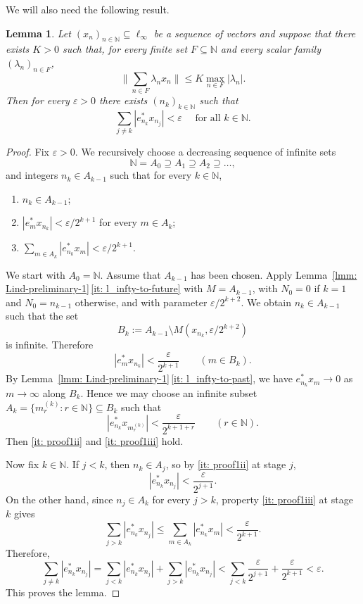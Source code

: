 \documentclass[11pt]{amsart}
\theoremstyle{plain}
\newtheorem{lemma}[theorem]{Lemma}
\theoremstyle{definition}
\numberwithin{equation}{section}
\newcommand{\norm}[1]{\lVert #1 \rVert}
\newcommand{\N}{\mathbb{N}}
\renewcommand{\le}{\leqslant}
\renewcommand{\leq}{\leqslant}
\begin{document}
We will also need the following result.

\begin{lemma}\label{lmm: l_inf-separate-interference}
    Let $(x_n)_{n \in \N} \subseteq \ell_\infty$ be a sequence of vectors and suppose that there exists $K > 0$ such that, for every finite set $F\subseteq\N$ and every scalar family $(\lambda_n)_{n\in F}$,
    \begin{equation}\label{eq: l_infty_summable}
        \norm{\sum_{n\in F} \lambda_n x_n} \leq K \max_{n\in F} |\lambda_n|.
    \end{equation}
     Then for every $\varepsilon > 0$ there exists $(n_k)_{k \in \N}$ such that
     \begin{equation*}
         \sum_{j \not=k} |e_{n_k}^* x_{n_j}| < \varepsilon \quad \text{ for all } k \in \N.
     \end{equation*}
\end{lemma}
\begin{proof}
Fix $\varepsilon>0$. We recursively choose a decreasing sequence of infinite sets
\[
\N = A_0\supseteq A_1\supseteq A_2\supseteq \ldots,
\]
and integers $n_k\in A_{k-1}$ such that for every $k\in\N$,
\begin{enumerate}[label=(\roman*), ref =(\roman*)]
    \item \label{it: proof1i} $n_k\in A_{k-1}$;
    \item \label{it: proof1ii} $|e_m^*x_{n_k}|<\varepsilon/2^{k+1}$ for every $m\in A_k$;
    \item \label{it: proof1iii} $\sum_{m\in A_k}|e_{n_k}^*x_m|<\varepsilon/2^{k+1}$.
\end{enumerate}
We start with $A_0=\N$. Assume that $A_{k-1}$ has been chosen. Apply Lemma~\ref{lmm: Lind-preliminary-1}\,\ref{it: l_infty-to-future} with $M=A_{k-1}$, with $N_0=0$ if $k=1$ and $N_0=n_{k-1}$ otherwise, and with parameter $\varepsilon/2^{k+2}$. We obtain $n_k\in A_{k-1}$ such that the set
\[
B_k:=A_{k-1}\setminus M(x_{n_k},\varepsilon/2^{k+2})
\]
is infinite. Therefore
\[
|e_m^*x_{n_k}|<\frac{\varepsilon}{2^{k+1}}
\qquad(m\in B_k).
\]
By Lemma~\ref{lmm: Lind-preliminary-1}\,\ref{it: l_infty-to-past}, we have
$e_{n_k}^*x_m\to 0$ as $m\to\infty$ along $B_k$.
Hence we may choose an infinite subset
$A_k=\{m_r^{(k)}:r\in\N\}\subseteq B_k$ such that
\[
|e_{n_k}^*x_{m_r^{(k)}}|<\frac{\varepsilon}{2^{k+1+r}}
\qquad(r\in\N).
\]
Then \ref{it: proof1ii} and \ref{it: proof1iii} hold.

Now fix $k\in\N$.
If $j<k$, then $n_k\in A_j$, so by \ref{it: proof1ii} at stage $j$,
\[
|e_{n_k}^*x_{n_j}|<\frac{\varepsilon}{2^{j+1}}.
\]
On the other hand, since $n_j\in A_k$ for every $j>k$, property \ref{it: proof1iii} at stage $k$ gives
\[
\sum_{j>k}|e_{n_k}^*x_{n_j}|
\le \sum_{m\in A_k}|e_{n_k}^*x_m|
<\frac{\varepsilon}{2^{k+1}}.
\]
Therefore,
\[
\sum_{j\neq k}|e_{n_k}^*x_{n_j}|
= \sum_{j<k}|e_{n_k}^*x_{n_j}| + \sum_{j>k}|e_{n_k}^*x_{n_j}|
< \sum_{j<k}\frac{\varepsilon}{2^{j+1}} + \frac{\varepsilon}{2^{k+1}}
< \varepsilon.
\]
This proves the lemma.
\end{proof}
\end{document}
